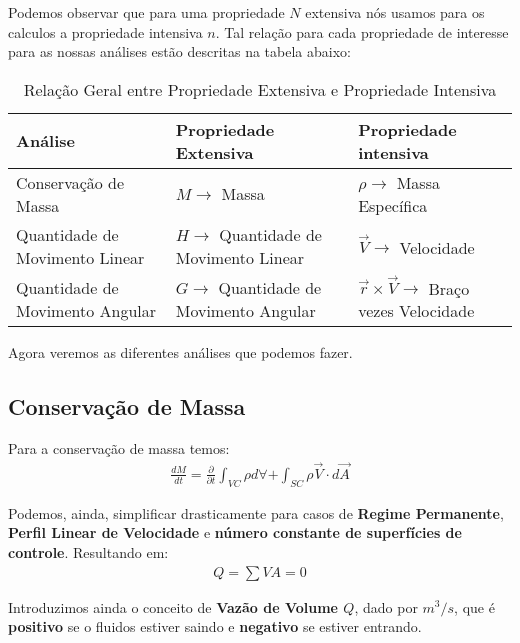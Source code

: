 \documentclass{article}
\begin{document}
Podemos observar que para uma propriedade $N$ extensiva nós usamos para os calculos a propriedade intensiva $n$. Tal relação para cada propriedade de interesse para as nossas análises estão descritas na tabela abaixo:

\begin{table}[H]
    \begin{tabularx}{\textwidth}{|l|X|X|} \hline
        \textbf{Análise}                & \textbf{Propriedade Extensiva}                  & \textbf{Propriedade intensiva}                             \\ \hline
        Conservação de Massa            & $M \rightarrow$ Massa                           & $\rho \rightarrow$ Massa Específica                        \\ \hline
        Quantidade de Movimento Linear  & $H \rightarrow$ Quantidade de Movimento Linear  & $\vec V \rightarrow$  Velocidade                           \\ \hline
        Quantidade de Movimento Angular & $G \rightarrow$ Quantidade de Movimento Angular & $\vec r \times \vec V \rightarrow$  Braço vezes Velocidade \\ \hline
    \end{tabularx}
    \caption{Relação Geral entre Propriedade Extensiva e Propriedade Intensiva}
\end{table}

Agora veremos as diferentes análises que podemos fazer.

\subsection{Conservação de Massa}
Para a conservação de massa temos:
\begin{align}
    \frac{dM}{dt} = \frac{\partial}{\partial t} \int_{VC} \rho d\forall + \int_{SC}\rho \vec V \cdot d \vec A
\end{align}

Podemos, ainda, simplificar drasticamente para casos de \textbf{Regime Permanente}, \textbf{Perfil Linear de Velocidade} e \textbf{número constante de superfícies de controle}. Resultando em:
\begin{align}
    Q =  \sum V A = 0
\end{align}

Introduzimos ainda o conceito de \textbf{Vazão de Volume $Q$}, dado por $m^3/s$, que é \textbf{positivo} se o fluidos estiver saindo e \textbf{negativo} se estiver entrando.
\end{document}
